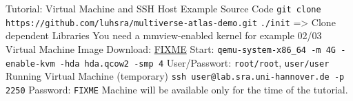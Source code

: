 \begin{frame}{Tutorial: Virtual Machine and SSH Host}
  \bi
  \ii Example Source Code {
    \bi
    \ii \texttt{git clone https://github.com/luhsra/multiverse-atlas-demo.git}
    \ii \texttt{./init} => Clone dependent Libraries
    \ii You need a mmview-enabled kernel for example 02/03
    \ei
  }
  \ii Virtual Machine Image {
    \bi
    \ii Download: \url{FIXME}
    \ii Start: \texttt{qemu-system-x86\_64 -m 4G -enable-kvm -hda hda.qcow2 -smp 4}
    \ii User/Passwort: \texttt{root/root}, \texttt{user/user}
    \ei
  }
  \qquad
  \ii Running Virtual Machine (temporary) {
    \bi
    \ii \texttt{ssh user@lab.sra.uni-hannover.de -p 2250}
    \ii Password: \texttt{FIXME}
    \ii Machine will be available only for the time of the tutorial.
    \ei
  }
  \ei
  
\end{frame}
